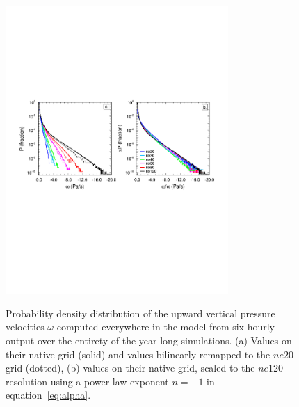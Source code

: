 \documentclass[times]{qjrms4}
\begin{document}
\begin{figure}
\begin{center}
\noindent\includegraphics[width=20pc,angle=0]{figs/temp_2pdf.pdf}\\
\end{center}
\caption{Probability density distribution of the upward vertical pressure velocities $\omega$ computed everywhere in the model from six-hourly output over the entirety of the year-long simulations. (a) Values on their native grid (solid) and values bilinearly remapped to the $ne20$ grid (dotted), (b) values on their native grid, scaled to the $ne120$ resolution using a power law exponent $n=-1$ in equation~\ref{eq:alpha}.}
\label{fig:2pdf}
\end{figure}
\end{document}
